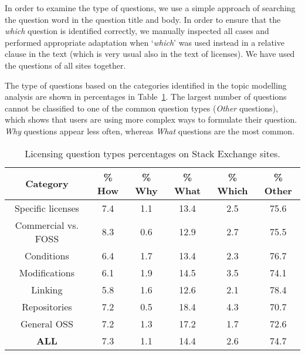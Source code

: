 \documentclass{elsarticle}
\begin{document}
In order to examine the type of questions, we use a simple approach of searching the question word in the question title and body. In order to ensure that the \emph{which} question is identified correctly, we manually inspected all cases and performed appropriate adaptation when `\emph{which}' was used instead in a relative clause in the text (which is very usual also in the text of licenses). We have used the questions of all sites together. 

The type of questions based on the categories identified in the topic modelling analysis are shown in percentages in Table~\ref{tab:questions-type}. The largest number of questions cannot be classified to one of the common question types (\emph{Other} questions), which shows that users are using more complex ways to formulate their question. \emph{Why} questions appear less often, whereas \emph{What} questions are the most common.  

\begin{table}
  \caption{Licensing question types percentages on Stack Exchange sites.}
  \label{tab:questions-type}
  \centering
  \begin{adjustbox}{width=0.84\textwidth}
  \begin{tabular}{cccccc}
    \hline
     \textbf{Category} & \textbf{\% How} & \textbf{\% Why} & \textbf{\% What} & \textbf{\% Which} & \textbf{\% Other}\\
     \hline
    Specific licenses&	7.4 &	1.1&	13.4&	2.5& 75.6\\
Commercial vs. FOSS&	8.3 &	0.6&	12.9&	2.7& 75.5\\
Conditions	&6.4&	1.7&	13.4&	2.3&	76.7\\
Modifications&	6.1&	1.9&14.5&	3.5&74.1\\
Linking&	5.8	&1.6&	12.6&	2.1	&78.4\\
Repositories	&7.2	&0.5&	18.4&	4.3&	70.7\\
General OSS&	7.2&	1.3&	17.2&	1.7&72.6\\
\hline
\textbf{ALL}&	7.3	&1.1&	14.4&	2.6	&74.7\\
  \hline
\end{tabular}
\end{adjustbox}
\end{table}
\end{document}
